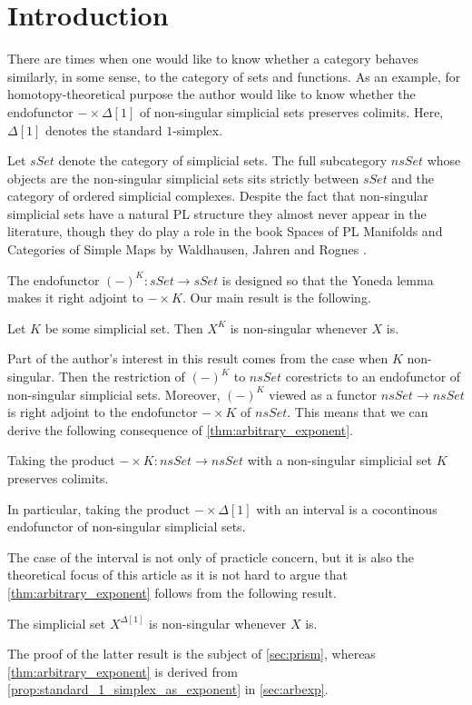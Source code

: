 \section{Introduction}
\label{sec:intro_exp}

There are times when one would like to know whether a category behaves similarly, in some sense, to the category of sets and functions. As an example, for homotopy-theoretical purpose the author would like to know whether the endofunctor $-\times \Delta [1]$ of non-singular simplicial sets preserves colimits. Here, $\Delta [1]$ denotes the standard $1$-simplex.

Let $sSet$ denote the category of simplicial sets. The full subcategory $nsSet$ whose objects are the non-singular simplicial sets sits strictly between $sSet$ and the category of ordered simplicial complexes. Despite the fact that non-singular simplicial sets have a natural PL structure \cite[p.~126--127]{WJR13} they almost never appear in the literature, though they do play a role in the book Spaces of PL Manifolds and Categories of Simple Maps by Waldhausen, Jahren and Rognes \cite{WJR13}.

The endofunctor $(-)^K:sSet\to sSet$ is designed so that the Yoneda lemma makes it right adjoint to $-\times K$. Our main result is the following.
\begin{theorem}\label{thm:arbitrary_exponent}
Let $K$ be some simplicial set. Then $X^K$ is non-singular whenever $X$ is.
\end{theorem}
\noindent Part of the author's interest in this result comes from the case when $K$ non-singular. Then the restriction of $(-)^K$ to $nsSet$ corestricts to an endofunctor of non-singular simplicial sets. Moreover, $(-)^K$ viewed as a functor $nsSet\to nsSet$ is right adjoint to the endofunctor $-\times K$ of $nsSet$. This means that we can derive the following consequence of \cref{thm:arbitrary_exponent}.
\begin{corollary}\label{cor:take_product_cocontinous_endofunctor_non-singular}
Taking the product $-\times K:nsSet\to nsSet$ with a non-singular simplicial set $K$ preserves colimits.
\end{corollary}
\noindent In particular, taking the product $-\times \Delta [1]$ with an interval is a cocontinous endofunctor of non-singular simplicial sets.

The case of the interval is not only of practicle concern, but it is also the theoretical focus of this article as it is not hard to argue that \cref{thm:arbitrary_exponent} follows from the following result.
\begin{proposition}\label{prop:standard_1_simplex_as_exponent}
The simplicial set $X^{\Delta [1]}$ is non-singular whenever $X$ is.
\end{proposition}
\noindent The proof of the latter result is the subject of \cref{sec:prism}, whereas \cref{thm:arbitrary_exponent} is derived from \cref{prop:standard_1_simplex_as_exponent} in \cref{sec:arbexp}.

